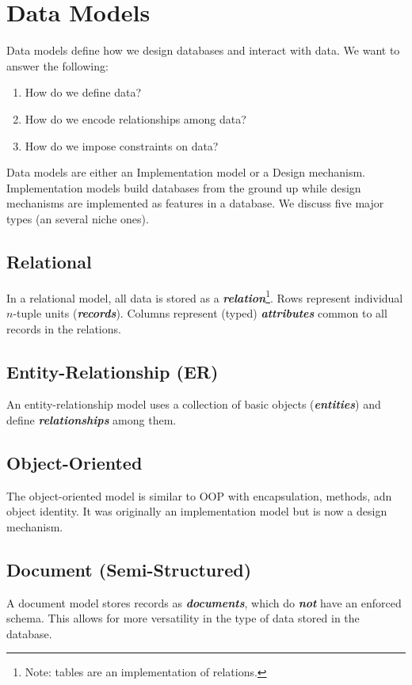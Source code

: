 \documentclass{report}
\newcommand{\ib}[1]{\textit{\textbf{{#1}}}}
\begin{document}
\section{Data Models}
Data models define how we design databases and interact with data. We want to answer the following:
\begin{enumerate}[label=$\to$]
    \item How do we define data?
    \item How do we encode relationships among data?
    \item How do we impose constraints on data?
\end{enumerate}
Data models are either an Implementation model or a Design mechanism. Implementation models build 
databases from the ground up while design mechanisms are implemented as features in a database. We 
discuss five major types (an several niche ones).

\subsection{Relational}
In a relational model, all data is stored as a \ib{relation}\footnote{Note: tables are an 
implementation of relations.}. Rows represent individual $n$-tuple units (\ib{records}). Columns 
represent (typed) \ib{attributes} common to all records in the relations.

\subsection{Entity-Relationship (ER)}
An entity-relationship model uses a collection of basic objects (\ib{entities}) and define 
\ib{relationships} among them.

\subsection{Object-Oriented}
The object-oriented model is similar to OOP with encapsulation, methods, adn object identity. It
was originally an implementation model but is now a design mechanism.

\subsection{Document (Semi-Structured)}
A document model stores records as \ib{documents}, which do \ib{not} have an enforced schema. This 
allows for more versatility in the type of data stored in the database.
\end{document}
